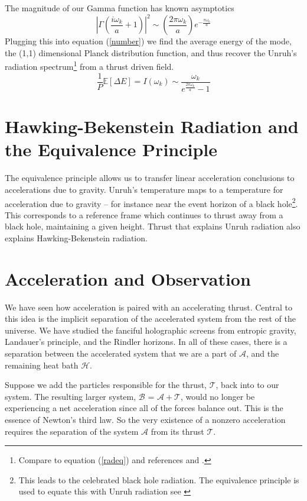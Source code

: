 \documentclass[12pt,a4paper]{article}
\begin{document}
The magnitude of our Gamma function has known asymptotics \cite[Eq.~5.11.9]{NIST:DLMF}
\[
\left|\Gamma\left(\frac{i\omega_k}{a} + 1\right) \right|^2 \sim \left(\frac{2 \pi \omega_k} {a}\right) e^{-\frac{\pi\omega_k}{a}}
\]
Plugging this into equation (\ref{number}) we find the average energy of the mode, the (1,1) dimensional Planck distribution function, and thus recover the Unruh's radiation spectrum\footnote{Compare to equation (\ref{radeq}) and references \cite{unruh} and \cite{Frodden}.} from a thrust driven field.
\[
\frac{1}{P} \mathbb{E}[\Delta E] = I(\omega_k) \sim \frac{\omega_k}{e^{\frac{2 \pi \omega_k}{a}}-1}
\]

\section{Hawking-Bekenstein Radiation and the Equivalence Principle}

The equivalence principle allows us to transfer linear acceleration conclusions to accelerations due to gravity.  Unruh's temperature maps to a temperature for acceleration due to gravity -- for instance near the event horizon of a black hole\footnote{This leads to the celebrated black hole radiation.  The equivalence principle is used to equate this with Unruh radiation see \cite{unruh}}.  This corresponds to a reference frame which continues to thrust away from a black hole, maintaining a given height.  Thrust that explains Unruh radiation also explains Hawking-Bekenstein radiation.

\section{Acceleration and Observation}
We have seen how acceleration is paired with an accelerating thrust.  Central to this idea is the implicit separation of the accelerated system from the rest of the universe.  We have studied the fanciful holographic screens from entropic gravity, Landauer's principle, and the Rindler horizons.  In all of these cases, there is a separation between the accelerated system that we are a part of $\mathcal{A}$, and the remaining heat bath $\mathcal{H}$.

Suppose we add the particles responsible for the thrust, $\mathcal{T}$, back into to our system.  The resulting larger system,  $\mathcal{B}$ = $\mathcal{A} + \mathcal{T}$, would no longer be experiencing a net acceleration since all of the forces balance out.  This is the essence of Newton's third law.  So the very existence of a nonzero acceleration requires the separation of the system $\mathcal{A}$ from its thrust $\mathcal{T}$.
\end{document}
